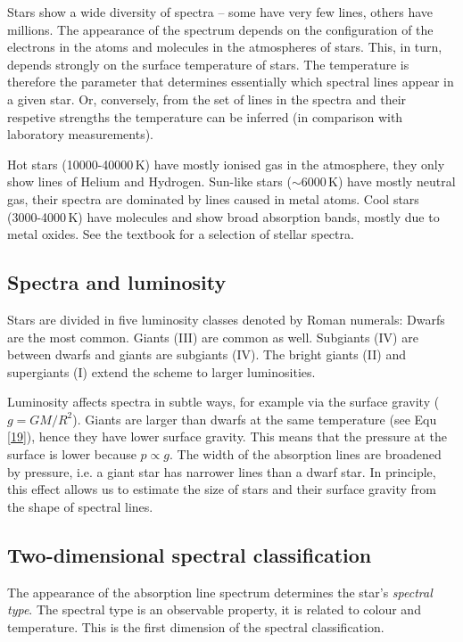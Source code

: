 Stars show a wide diversity of spectra -- some have very few lines, others have millions. The appearance of the spectrum depends on the configuration of the electrons in the atoms and molecules in the atmospheres of stars. This, in turn, depends strongly on the surface temperature of stars. The temperature is therefore the parameter that determines essentially which spectral lines appear in a given star. Or, conversely, from the set of lines in the spectra and their respetive strengths the temperature can be inferred (in comparison with laboratory measurements).

Hot stars (10000-40000\,K) have mostly ionised gas in the atmosphere, they only show lines of Helium and Hydrogen. Sun-like stars ($\sim 6000$\,K) have mostly neutral gas, their spectra are dominated by lines caused in metal atoms. Cool stars (3000-4000\,K) have molecules and show broad absorption bands, mostly due to metal oxides. See the textbook for a selection of stellar spectra.

\subsection{Spectra and luminosity}

Stars are divided in five luminosity classes denoted by Roman numerals: Dwarfs are the most common. Giants (III) are common as well. Subgiants (IV) are between dwarfs and giants are subgiants (IV). The bright giants (II) and supergiants (I) extend the scheme to larger luminosities. 

Luminosity affects spectra in subtle ways, for example via the surface gravity ($g = GM/R^2$). Giants are larger than dwarfs at the same temperature (see Equ \eqref{19}), hence they have lower surface gravity. This means that the pressure at the surface is lower because $p \propto g$. The width of the absorption lines are broadened by pressure, i.e. a giant star has narrower lines than a dwarf star. In principle, this effect allows us to estimate the size of stars and their surface gravity from the shape of spectral lines.

\subsection{Two-dimensional spectral classification}

The appearance of the absorption line spectrum determines the star's \textit{spectral type}. The spectral type is an observable property, it is related to colour and temperature. This is the first dimension of the spectral classification. 

